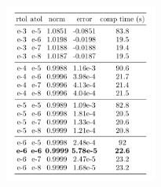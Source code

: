 \documentclass[aps,pra,reprint, onecolumn]{revtex4-2}
\newcommand\setrow[1]{\gdef\rowmac{#1}#1\ignorespaces}
\newcommand\clearrow{\global\let\rowmac\relax}
\begin{document}
\begin{figure}[ht]
\includegraphics[width=5cm]{./figures/runge.png}%
\end{figure}

\clearpage




\end{document}
